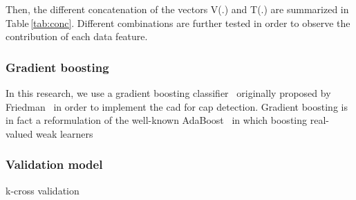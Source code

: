 Then, the different concatenation of the vectors V(.) and T(.) are summarized in Table\,\ref{tab:conc}. Different combinations are further tested in order to observe the contribution of each data feature.

\subsubsection{Gradient boosting}\label{subsubsec:gradboost}

In this research, we use a gradient boosting classifier~\cite{Becker2013} originally proposed by Friedman~\cite{Friedman1999,Friedman2000} in order to implement the \ac{cad} for \ac{cap} detection. Gradient boosting is in fact a reformulation of the well-known AdaBoost~\cite{Freund1997} in which boosting real-valued weak learners 

\subsubsection{Validation model}\label{subsubsec:valmod}

k-cross validation

